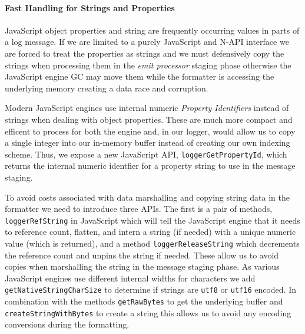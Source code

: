 \paragraph{Fast Handling for Strings and Properties}
\noindent
JavaScript object properties and string are frequently occurring values in 
parts of a log message. If we are limited to a purely JavaScript and N-API 
interface we are forced to treat the properties as strings and we must 
defensively copy the strings when processing them in the \emph{emit processor} staging 
phase otherwise the JavaScript engine GC may move them while the formatter is 
accessing the underlying memory creating a data race and corruption. 

Modern JavaScript engines use internal numeric \emph{Property Identifiers} 
instead of strings when dealing with object properties. These are much more 
compact and efficent to process for both the engine and, in our logger, would 
allow us to copy a single integer into our in-memory buffer instead of creating 
our own indexing scheme. Thus, we expose a new 
JavaScript API, \texttt{loggerGetPropertyId}, which returns the 
internal numeric identfier for a property string to use in the message staging. 

To avoid costs associated with data marshalling and copying string data 
in the formatter we need to introduce three APIs. The first is a pair of 
methods, \texttt{loggerRefString} in JavaScript which will tell the JavaScript 
engine that it needs to reference count, flatten, and intern a string (if needed) 
with a unique numeric value (which is returned), and a method \texttt{loggerReleaseString} 
which decrements the reference count and unpins the string if needed. These 
allow us to avoid copies when marshalling the string in the message staging 
phase. As various JavaScript engines use different internal widths for characters 
we add \texttt{getNativeStringCharSize} to determine if strings 
are \texttt{utf8} or \texttt{utf16} encoded. In combination with the methods \texttt{getRawBytes} 
to get the underlying buffer and \texttt{createStringWithBytes} to create a string this allows us to avoid any encoding 
conversions during the formatting. 

